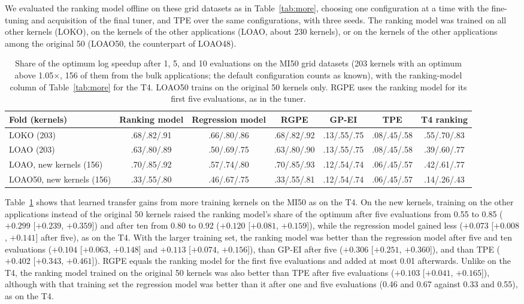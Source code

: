\documentclass[10pt]{article}
\newcommand{\x}{\ensuremath{\times}}
\begin{document}
We evaluated the ranking model offline on these grid datasets as in
Table~\ref{tab:more}, choosing one configuration at a time with the fine-tuning
and acquisition of the final tuner, and TPE over the same configurations, with
three seeds. The ranking model was trained on all other kernels (LOKO), on the
kernels of the other applications (LOAO, about 230 kernels), or on the kernels
of the other applications among the original 50 (LOAO50, the counterpart of
LOAO48).

\begin{table}[t]
\centering
\caption{Share of the optimum log speedup after 1, 5, and 10 evaluations on the MI50 grid datasets (203 kernels with an optimum above 1.05\x{}, 156 of them from the bulk applications; the default configuration counts as known), with the ranking-model column of Table~\ref{tab:more} for the T4. LOAO50 trains on the original 50 kernels only. RGPE uses the ranking model for its first five evaluations, as in the tuner.}
\label{tab:mi50more}
\small
\setlength{\tabcolsep}{3.5pt}
\begin{tabular}{lcccccc}
\toprule
Fold (kernels) & Ranking model & Regression model & RGPE & GP-EI & TPE & T4 ranking \\
\midrule
LOKO (203) & .68/.82/.91 & .66/.80/.86 & .68/.82/.92 & .13/.55/.75 & .08/.45/.58 & .55/.70/.83 \\
LOAO (203) & .63/.80/.89 & .50/.69/.75 & .63/.80/.90 & .13/.55/.75 & .08/.45/.58 & .39/.60/.77 \\
LOAO, new kernels (156) & .70/.85/.92 & .57/.74/.80 & .70/.85/.93 & .12/.54/.74 & .06/.45/.57 & .42/.61/.77 \\
LOAO50, new kernels (156) & .33/.55/.80 & .46/.67/.75 & .33/.55/.81 & .12/.54/.74 & .06/.45/.57 & .14/.26/.43 \\
\bottomrule
\end{tabular}
\end{table}

Table~\ref{tab:mi50more} shows that learned transfer gains from more training
kernels on the MI50 as on the T4. On the new kernels, training on the other
applications instead of the original 50 kernels raised the ranking model's
share of the optimum after five evaluations from 0.55 to 0.85 ($+0.299$
[$+0.239$, $+0.359$]) and after ten from 0.80 to 0.92 ($+0.120$ [$+0.081$,
$+0.159$]), while the regression model gained less ($+0.073$ [$+0.008$,
$+0.141$] after five), as on the T4. With the larger training set, the ranking
model was better than the regression model after five and ten evaluations
($+0.104$ [$+0.063$, $+0.148$] and $+0.113$ [$+0.074$, $+0.156$]), than GP-EI
after five ($+0.306$ [$+0.251$, $+0.360$]), and than TPE ($+0.402$ [$+0.343$,
$+0.461$]). RGPE equals the ranking model for the first five evaluations and
added at most 0.01 afterwards. Unlike on the T4, the ranking model trained on
the original 50 kernels was also better than TPE after five evaluations
($+0.103$ [$+0.041$, $+0.165$]), although with that training set the regression
model was better than it after one and five evaluations (0.46 and 0.67 against
0.33 and 0.55), as on the T4.
\end{document}
